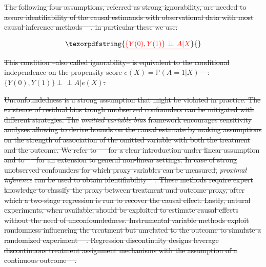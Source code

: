 \documentclass[10pt,letterpaper]{article}
\newcommand{\indep}{\perp \!\!\! \perp}
\newtheorem{assumption}{Assumption}
\providecommand{\DIFdeltex}[1]{{\protect\color{red}\sout{#1}}}                      %
\providecommand{\DIFdelbegin}{} %
\providecommand{\DIFdel}[1]{\texorpdfstring{\DIFdeltex{#1}}{}} %
\newcommand{\DIFscaledelfig}{0.5}
\newlength{\DIFdelgraphicswidth} %
\newlength{\DIFdelgraphicsheight} %
\newcommand{\DIFdelincludegraphics}[2][]{%
\sbox{\DIFdelgraphicsbox}{\DIFOincludegraphics[#1]{#2}}%
\settoboxwidth{\DIFdelgraphicswidth}{\DIFdelgraphicsbox} %
\settoboxtotalheight{\DIFdelgraphicsheight}{\DIFdelgraphicsbox} %
\scalebox{\DIFscaledelfig}{%
\parbox[b]{\DIFdelgraphicswidth}{\usebox{\DIFdelgraphicsbox}\\[-\baselineskip] \rule{\DIFdelgraphicswidth}{0em}}\llap{\resizebox{\DIFdelgraphicswidth}{\DIFdelgraphicsheight}{%
\setlength{\unitlength}{\DIFdelgraphicswidth}%
\begin{picture}(1,1)%
\thicklines\linethickness{2pt} %
{\color[rgb]{1,0,0}\put(0,0){\framebox(1,1){}}}%
{\color[rgb]{1,0,0}\put(0,0){\line( 1,1){1}}}%
{\color[rgb]{1,0,0}\put(0,1){\line(1,-1){1}}}%
\end{picture}%
}\hspace*{3pt}}} %
} %
\DeclareRobustCommand{\DIFdelbegin}{\DIFOdelbegin \let\includegraphics\DIFdelincludegraphics} %
\begin{document}
\DIFdelbegin \DIFdel{The following four assumptions, referred as strong ignorability, are
  needed to assure identifiability of the causal estimands with observational
  data with most causal-inference methods \mbox{%
    \cite{rubin2005causal}}\hskip0pt%
  , in
  particular these we use:
}%

\begin{displaymath}\DIFdel{%
    \{Y(0), Y(1) \} \indep A | X
  }\end{displaymath}%
\DIFdel{This condition --also called ignorability-- is equivalent to the conditional
  independence on the propensity score $e(X)=\mathbb P(A=1|X)$ \mbox{%
    \cite{rosenbaum1983central}}\hskip0pt%
  : $\{Y(0), Y(1) \}\indep  A | e(X)$.
}%

\DIFdel{Unconfoundedness is a strong assumption that might be violated in practice. The
  existence of residual bias trough unobserved confounders can be mitigated with
  different strategies. The }\textit{\DIFdel{omitted variable bias}} %
\DIFdel{framework encourages
  sensitivity analyses allowing to derive bounds on the causal estimate by making
  assumptions on the strength of association of the omitted variable with both the
  treatment and the outcome. We refer to \mbox{%
    \cite{cinelli2020making} }\hskip0pt%
  for a clear
  introduction under linear assumption and to \mbox{%
    \cite{chernozhukov2022long} }\hskip0pt%
  for an
  extension to general non-linear settings. In case of strong unobserved
  confounders for which proxy variables can be measured, }\textit{\DIFdel{proximal
    inference}} %
\DIFdel{can be used to obtain identifiability
  \mbox{%
    \cite{tchetgen2024introduction}}\hskip0pt%
  . These methods require expert knowledge to
  classify the proxy between treatment and outcome proxy, after which a two-stage
  regression is run to recover the causal effect. Lastly, natural experiments, when
  available, should be exploited to estimate causal effects without the need of
  unconfoundedness. Instrumental variable methods exploit randomness influencing
  the treatment but unrelated to the outcome to simulate a randomized experiment
  \mbox{%
    \cite[chapter 9]{wager2020stats}}\hskip0pt%
  . Regression discontinuity designs leverage
  discontinuous treatment assignment mechanisms with the assumption of a
  continuous outcome \mbox{%
    \cite[chapter 5]{wager2020stats}}\hskip0pt%
  .
}%
\end{document}
